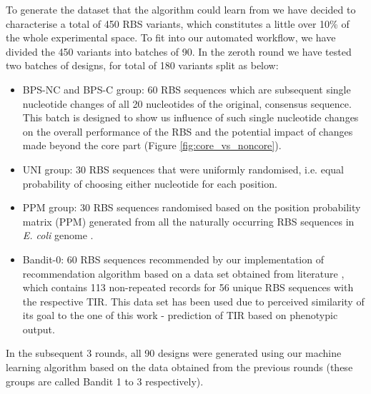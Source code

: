 \documentclass{article}
\newcommand{\mengyan}[1]{\textcolor{magenta}{#1}}
\begin{document}
To generate the dataset that the algorithm could learn from we have decided to characterise a total of 450 RBS variants, which constitutes a little over 10\% of the whole experimental space. 
To fit into our automated workflow, we have divided the 450 variants into batches of 90.
In the zeroth round we have tested two batches of designs, for total of 180 variants split as below: 
\begin{itemize}
    \item BPS-NC and BPS-C group: 60 RBS sequences which are subsequent single nucleotide changes of all 20 nucleotides of the original, consensus sequence. This batch is designed to show us influence of such single nucleotide changes on the overall performance of the RBS and the potential impact of changes made beyond the core part (Figure \ref{fig:core_vs_noncore}).
    \item UNI group: 30 RBS sequences that were  uniformly randomised, i.e. equal probability of choosing either nucleotide for each position. 
    \item PPM group: 30 RBS sequences randomised based on the position probability matrix (PPM) generated from all the naturally occurring RBS sequences in \emph{E. coli} genome \cite{Stormo1982}.
    \item Bandit-0: 60 RBS sequences recommended by our implementation of recommendation algorithm based on a data set obtained from literature \cite{jervis2018machine}, which contains 113 non-repeated records for 56 unique RBS sequences with the respective TIR.
    This data set has been used due to perceived similarity of its goal to the one of this work - prediction of TIR based on phenotypic output.
\end{itemize}
In the subsequent 3 rounds, all 90 designs were generated using our machine learning algorithm based on the data obtained from the previous rounds (these groups are called Bandit 1 to 3 respectively).
\end{document}
